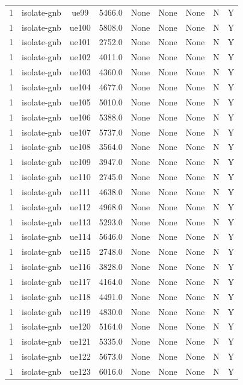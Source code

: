 \begin{table}[ht]
\begin{tabular}{|c|c|c|c|c|c|c|c|c|}
1 & isolate-gnb & ue99 & 5466.0 & None & None & None & N & Y \\
1 & isolate-gnb & ue100 & 5808.0 & None & None & None & N & Y \\
1 & isolate-gnb & ue101 & 2752.0 & None & None & None & N & Y \\
1 & isolate-gnb & ue102 & 4011.0 & None & None & None & N & Y \\
1 & isolate-gnb & ue103 & 4360.0 & None & None & None & N & Y \\
1 & isolate-gnb & ue104 & 4677.0 & None & None & None & N & Y \\
1 & isolate-gnb & ue105 & 5010.0 & None & None & None & N & Y \\
1 & isolate-gnb & ue106 & 5388.0 & None & None & None & N & Y \\
1 & isolate-gnb & ue107 & 5737.0 & None & None & None & N & Y \\
1 & isolate-gnb & ue108 & 3564.0 & None & None & None & N & Y \\
1 & isolate-gnb & ue109 & 3947.0 & None & None & None & N & Y \\
1 & isolate-gnb & ue110 & 2745.0 & None & None & None & N & Y \\
1 & isolate-gnb & ue111 & 4638.0 & None & None & None & N & Y \\
1 & isolate-gnb & ue112 & 4968.0 & None & None & None & N & Y \\
1 & isolate-gnb & ue113 & 5293.0 & None & None & None & N & Y \\
1 & isolate-gnb & ue114 & 5646.0 & None & None & None & N & Y \\
1 & isolate-gnb & ue115 & 2748.0 & None & None & None & N & Y \\
1 & isolate-gnb & ue116 & 3828.0 & None & None & None & N & Y \\
1 & isolate-gnb & ue117 & 4164.0 & None & None & None & N & Y \\
1 & isolate-gnb & ue118 & 4491.0 & None & None & None & N & Y \\
1 & isolate-gnb & ue119 & 4830.0 & None & None & None & N & Y \\
1 & isolate-gnb & ue120 & 5164.0 & None & None & None & N & Y \\
1 & isolate-gnb & ue121 & 5335.0 & None & None & None & N & Y \\
1 & isolate-gnb & ue122 & 5673.0 & None & None & None & N & Y \\
1 & isolate-gnb & ue123 & 6016.0 & None & None & None & N & Y \\

\end{tabular}
\end{table}
